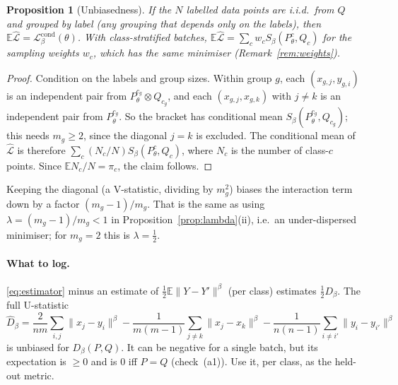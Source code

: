 \documentclass[11pt]{article}
\newtheorem{proposition}[theorem]{Proposition}
\theoremstyle{definition}
\theoremstyle{remark}
\newcommand{\E}{\mathbb{E}}
\newcommand{\norm}[1]{\lVert #1\rVert}
\newcommand{\Sb}{S_\beta}
\newcommand{\Db}{D_\beta}
\begin{document}
\begin{proposition}[Unbiasedness]\label{prop:unbiased}
If the $N$ labelled data points are i.i.d.\ from $Q$ and grouped by label (any grouping that depends only on
the labels), then $\E\widehat{\mathcal L}=\mathcal L^{\mathrm{cond}}_\beta(\theta)$. With class-stratified
batches, $\E\widehat{\mathcal L}=\sum_cw_c\Sb(P^c_\theta,Q_c)$ for the sampling weights $w_c$, which has
the same minimiser (Remark~\ref{rem:weights}).
\end{proposition}
\begin{proof}
Condition on the labels and group sizes. Within group $g$, each $(x_{g,j},y_{g,i})$ is an independent pair
from $P^{c_g}_\theta\otimes Q_{c_g}$, and each $(x_{g,j},x_{g,k})$ with $j\neq k$ is an independent pair from
$P^{c_g}_\theta$. So the bracket has conditional mean $\Sb(P^{c_g}_\theta,Q_{c_g})$; this needs $m_g\ge2$,
since the diagonal $j=k$ is excluded. The conditional mean of $\widehat{\mathcal L}$ is therefore
$\sum_c(N_c/N)\Sb(P^c_\theta,Q_c)$, where $N_c$ is the number of class-$c$ points. Since $\E N_c/N=\pi_c$, the
claim follows.
\end{proof}
Keeping the diagonal (a V-statistic, dividing by $m_g^2$) biases the interaction term down by a factor
$(m_g-1)/m_g$. That is the same as using $\lambda=(m_g-1)/m_g<1$ in Proposition~\ref{prop:lambda}(ii), i.e.\ an
under-dispersed minimiser; for $m_g=2$ this is $\lambda=\tfrac12$.

\paragraph{What to log.} \eqref{eq:estimator} minus an estimate of $\tfrac12\E\norm{Y-Y'}^\beta$
(per class) estimates $\tfrac12\Db$. The full U-statistic
\[
\widehat D_\beta=\frac{2}{nm}\sum_{i,j}\norm{x_j-y_i}^\beta-\frac{1}{m(m-1)}\sum_{j\neq k}\norm{x_j-x_k}^\beta-\frac{1}{n(n-1)}\sum_{i\neq i'}\norm{y_i-y_{i'}}^\beta
\]
is unbiased for $\Db(P,Q)$. It can be negative for a single batch, but its expectation is $\ge0$ and is $0$
iff $P=Q$ (check~(a1)). Use it, per class, as the held-out metric.
\end{document}
